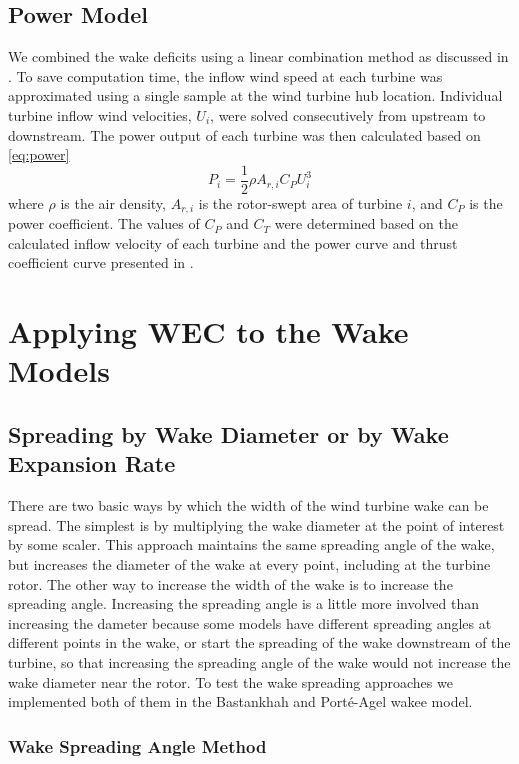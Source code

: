 \documentclass[a4paper]{jpconf}
\begin{document}
\subsection{Power Model}
We combined the wake deficits using a linear combination method as discussed in \cite{niayifar2016}. To save computation time, the inflow wind speed at each turbine was approximated using a single sample at the wind turbine hub location. Individual turbine inflow wind velocities, $U_i$, were solved consecutively from upstream to downstream. The power output of each turbine was then calculated based on \cref{eq:power}
%
\begin{equation}\label{eq:power}
P_i = \frac{1}{2}\rho A_{r,i}C_P U_i^3
\end{equation}
%
where $\rho$ is the air density, $A_{r,i}$ is the rotor-swept area of turbine $i$, and $C_P$ is the power coefficient. The values of $C_P$ and $C_T$ were determined based on the calculated inflow velocity of each turbine and the power curve and thrust coefficient curve presented in \cite{niayifar2016}.


\section{Applying WEC to the  Wake Models}

\subsection{Spreading by Wake Diameter or by Wake Expansion Rate}
There are two basic ways by which the width of the wind turbine wake can be spread. The simplest is by multiplying the wake diameter at the point of interest by some scaler. This approach maintains the same spreading angle of the wake, but increases the diameter of the wake at every point, including at the turbine rotor. The other way to increase the width of the wake is to increase the spreading angle. Increasing the spreading angle is a little more involved than increasing the dameter because some models have different spreading angles at different points in the wake, or start the spreading of the wake downstream of the turbine, so that increasing the spreading angle of the wake would not increase the wake diameter near the rotor. To test the wake spreading  approaches we implemented both of them in the Bastankhah and Port\'{e}-Agel wakee model.

\subsubsection{Wake Spreading Angle Method}
\end{document}
